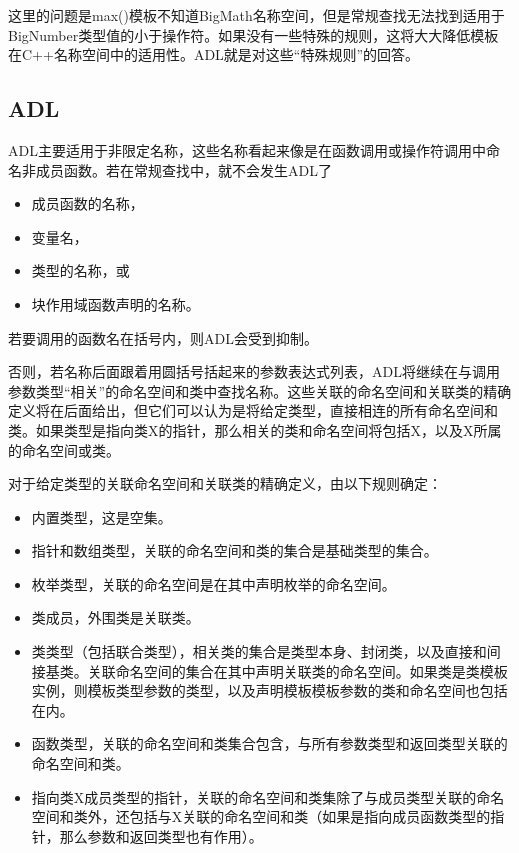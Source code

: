这里的问题是max()模板不知道BigMath名称空间，但是常规查找无法找到适用于BigNumber类型值的小于操作符。如果没有一些特殊的规则，这将大大降低模板在C++名称空间中的适用性。ADL就是对这些“特殊规则”的回答。

\subsection{ADL}


ADL主要适用于非限定名称，这些名称看起来像是在函数调用或操作符调用中命名非成员函数。若在常规查找中，就不会发生ADL了

\begin{itemize}
\item 
成员函数的名称，

\item 
变量名，

\item 
类型的名称，或

\item 
块作用域函数声明的名称。
\end{itemize}

若要调用的函数名在括号内，则ADL会受到抑制。

否则，若名称后面跟着用圆括号括起来的参数表达式列表，ADL将继续在与调用参数类型“相关”的命名空间和类中查找名称。这些关联的命名空间和关联类的精确定义将在后面给出，但它们可以认为是将给定类型，直接相连的所有命名空间和类。如果类型是指向类X的指针，那么相关的类和命名空间将包括X，以及X所属的命名空间或类。

对于给定类型的关联命名空间和关联类的精确定义，由以下规则确定：

\begin{itemize}
\item 
内置类型，这是空集。

\item 
指针和数组类型，关联的命名空间和类的集合是基础类型的集合。

\item 
枚举类型，关联的命名空间是在其中声明枚举的命名空间。

\item 
类成员，外围类是关联类。

\item 
类类型（包括联合类型），相关类的集合是类型本身、封闭类，以及直接和间接基类。关联命名空间的集合在其中声明关联类的命名空间。如果类是类模板实例，则模板类型参数的类型，以及声明模板模板参数的类和命名空间也包括在内。

\item 
函数类型，关联的命名空间和类集合包含，与所有参数类型和返回类型关联的命名空间和类。

\item 
指向类X成员类型的指针，关联的命名空间和类集除了与成员类型关联的命名空间和类外，还包括与X关联的命名空间和类（如果是指向成员函数类型的指针，那么参数和返回类型也有作用）。
\end{itemize}

